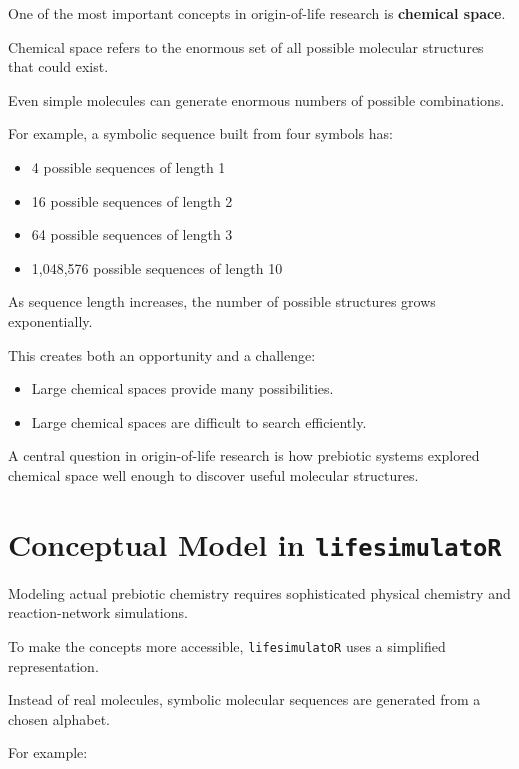 \documentclass[
  oneside,
  openany]{book}
\providecommand{\tightlist}{%
  \setlength{\itemsep}{0pt}\setlength{\parskip}{0pt}}
\begin{document}
One of the most important concepts in origin-of-life research is \textbf{chemical space}.

Chemical space refers to the enormous set of all possible molecular structures that could exist.

Even simple molecules can generate enormous numbers of possible combinations.

For example, a symbolic sequence built from four symbols has:

\begin{itemize}
\tightlist
\item
  4 possible sequences of length 1
\item
  16 possible sequences of length 2
\item
  64 possible sequences of length 3
\item
  1,048,576 possible sequences of length 10
\end{itemize}

As sequence length increases, the number of possible structures grows exponentially.

This creates both an opportunity and a challenge:

\begin{itemize}
\tightlist
\item
  Large chemical spaces provide many possibilities.
\item
  Large chemical spaces are difficult to search efficiently.
\end{itemize}

A central question in origin-of-life research is how prebiotic systems explored chemical space well enough to discover useful molecular structures.

\section{\texorpdfstring{Conceptual Model in \texttt{lifesimulatoR}}{Conceptual Model in lifesimulatoR}}\label{conceptual-model-in-lifesimulator}

Modeling actual prebiotic chemistry requires sophisticated physical chemistry and reaction-network simulations.

To make the concepts more accessible, \texttt{lifesimulatoR} uses a simplified representation.

Instead of real molecules, symbolic molecular sequences are generated from a chosen alphabet.

For example:
\end{document}
